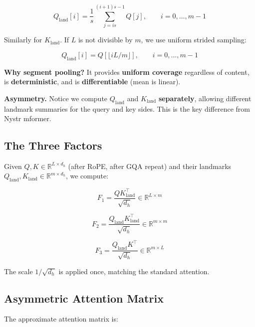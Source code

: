 \begin{equation}
Q_\text{land}[i] = \frac{1}{s} \sum_{j = i s}^{(i+1) s - 1} Q[j], \qquad i = 0, \ldots, m - 1
\end{equation}

Similarly for $K_\text{land}$. If $L$ is not divisible by $m$, we use 
uniform strided sampling:

\begin{equation}
Q_\text{land}[i] = Q[\lfloor i L / m \rfloor], \qquad i = 0, \ldots, m - 1
\end{equation}

\textbf{Why segment pooling?} It provides \textbf{uniform coverage} regardless of 
content, is \textbf{deterministic}, and is \textbf{differentiable} (mean is linear).

\textbf{Asymmetry.} Notice we compute $Q_\text{land}$ and $K_\text{land}$ 
\textbf{separately}, allowing different landmark summaries for the query and 
key sides. This is the key difference from Nystr mformer.

\subsection{The Three Factors}

Given $Q, K \in \mathbb{R}^{L \times d_h}$ (after RoPE, after GQA repeat) and 
their landmarks $Q_\text{land}, K_\text{land} \in \mathbb{R}^{m \times d_h}$, 
we compute:

\begin{equation}
F_1 = \frac{Q K_\text{land}^\top}{\sqrt{d_h}} \in \mathbb{R}^{L \times m}
\end{equation}

\begin{equation}
F_2 = \frac{Q_\text{land} K_\text{land}^\top}{\sqrt{d_h}} \in \mathbb{R}^{m \times m}
\end{equation}

\begin{equation}
F_3 = \frac{Q_\text{land} K^\top}{\sqrt{d_h}} \in \mathbb{R}^{m \times L}
\end{equation}

The scale $1/\sqrt{d_h}$ is applied once, matching the standard attention.

\subsection{Asymmetric Attention Matrix}

The approximate attention matrix is:

